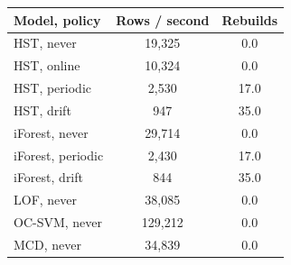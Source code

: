 \begin{tabular}{lcc}
\toprule
Model, policy & Rows / second & Rebuilds \\
\midrule
HST, never & 19,325 & 0.0 \\
HST, online & 10,324 & 0.0 \\
HST, periodic & 2,530 & 17.0 \\
HST, drift & 947 & 35.0 \\
iForest, never & 29,714 & 0.0 \\
iForest, periodic & 2,430 & 17.0 \\
iForest, drift & 844 & 35.0 \\
LOF, never & 38,085 & 0.0 \\
OC-SVM, never & 129,212 & 0.0 \\
MCD, never & 34,839 & 0.0 \\
\bottomrule
\end{tabular}
